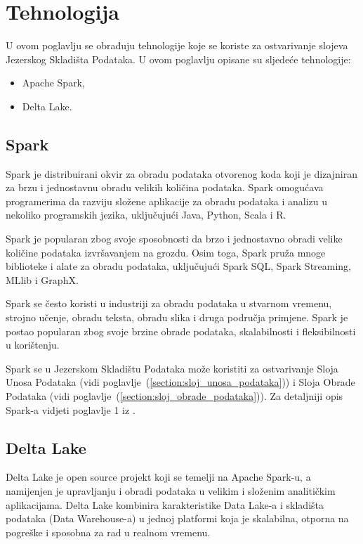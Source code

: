 \chapter{Tehnologija}
U ovom poglavlju se obrađuju tehnologije koje se koriste za ostvarivanje slojeva
Jezerskog Skladišta Podataka. U ovom poglavlju opisane su sljedeće tehnologije:
\begin{itemize}
    \item Apache Spark,
    \item Delta Lake.    
\end{itemize}

\section{Spark}
Spark je distribuirani okvir za obradu podataka otvorenog koda koji je
dizajniran za brzu i jednostavnu obradu velikih količina podataka. Spark
omogućava programerima da razviju složene aplikacije za obradu podataka i
analizu u nekoliko programskih jezika, uključujući Java, Python, Scala i R.

Spark je popularan zbog svoje sposobnosti da brzo i jednostavno obradi velike
količine podataka izvršavanjem na grozdu. Osim toga, Spark pruža mnoge
biblioteke i alate za obradu podataka, uključujući Spark SQL, Spark Streaming,
MLlib i GraphX.

Spark se često koristi u industriji za obradu podataka u stvarnom vremenu,
strojno učenje, obradu teksta, obradu slika i druga područja primjene. Spark je
postao popularan zbog svoje brzine obrade podataka, skalabilnosti i
fleksibilnosti u korištenju. 

Spark se u Jezerskom Skladištu Podataka može koristiti za ostvarivanje Sloja
Unosa Podataka (vidi poglavlje~(\ref{section:sloj_unosa_podataka})) i Sloja
Obrade Podataka (vidi poglavlje~(\ref{section:sloj_obrade_podataka})). Za
detaljniji opis Spark-a vidjeti poglavlje 1 iz \cite[c.1]{spark2020}.

\section{Delta Lake}
Delta Lake je open source projekt koji se temelji na Apache Spark-u, a
namijenjen je upravljanju i obradi podataka u velikim i složenim analitičkim
aplikacijama. Delta Lake kombinira karakteristike Data Lake-a i skladišta
podataka (Data Warehouse-a) u jednoj platformi koja je skalabilna, otporna na
pogreške i sposobna za rad u realnom vremenu.

